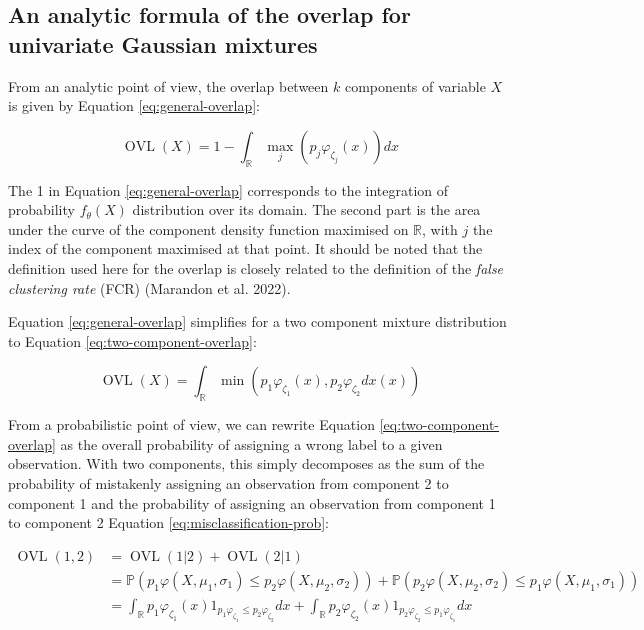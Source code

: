 \hypertarget{an-analytic-formula-of-the-overlap-for-univariate-gaussian-mixtures}{%
\subsection{An analytic formula of the overlap for univariate Gaussian mixtures}\label{an-analytic-formula-of-the-overlap-for-univariate-gaussian-mixtures}}

From an analytic point of view, the overlap between \(k\) components of
variable \(X\) is given by Equation \eqref{eq:general-overlap}:

\begin{equation}
    \operatorname{OVL} (X)= 1 - \int_{\mathbb{R}} \max_j (p_j \varphi_{\zeta_j} (x)) dx
\label{eq:general-overlap}
\end{equation}

The 1 in Equation \eqref{eq:general-overlap} corresponds to the
integration of probability \(f_{\theta}(X)\) distribution over its domain.
The second part is the area under the curve of the component density
function maximised on \(\mathbb{R}\), with \(j\) the index of the component
maximised at that point. It should be noted that the definition used here for the overlap is closely related to the definition of the \emph{false clustering rate} (FCR) (Marandon et al. 2022).

Equation \eqref{eq:general-overlap} simplifies for a two component
mixture distribution to Equation \eqref{eq:two-component-overlap}:

\begin{equation}
    \operatorname{OVL} (X)= \int_{\mathbb{R}} \min \left(p_1 \varphi_{\zeta_1} (x), p_2 \varphi_{\zeta_2} dx (x)\right)
\label{eq:two-component-overlap}
\end{equation}

From a probabilistic point of view, we can rewrite Equation
\eqref{eq:two-component-overlap} as the overall probability of assigning
a wrong label to a given observation. With two components, this simply
decomposes as the sum of the probability of mistakenly assigning an
observation from component 2 to component 1 and the probability of
assigning an observation from component 1 to component 2 Equation
\eqref{eq:misclassification-prob}:

\begin{equation}
\begin{split}
\operatorname{OVL} (1, 2) & = \operatorname{OVL} (1 | 2) + \operatorname{OVL} (2 | 1) \\
& = \mathbb{P}\left(p_1 \varphi (X, \mu_1, \sigma_1) \le p_2 \varphi (X, \mu_2, \sigma_2) \right) + \mathbb{P}\left(p_2 \varphi (X, \mu_2, \sigma_2) \le p_1 \varphi (X, \mu_1, \sigma_1)\right) \\
& = \int_{\mathbb{R}} p_1 \varphi_{\zeta_1} (x) \mathrm{1}_{p_1 \varphi_{\zeta_1}  \le p_2 \varphi_{\zeta_2}} dx + \int_{\mathbb{R}} p_2 \varphi_{\zeta_2} (x) \mathrm{1}_{p_2 \varphi_{\zeta_2} \le p_1 \varphi_{\zeta_1}} dx
\end{split}
\label{eq:misclassification-prob}
\end{equation}

